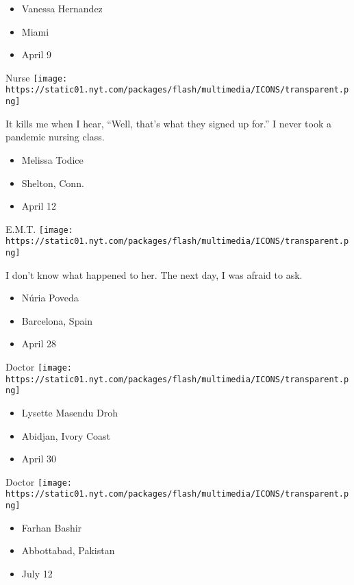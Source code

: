 \begin{itemize}
\tightlist
\item
  Vanessa Hernandez
\item
  Miami
\item
  April 9
\end{itemize}

\protect\hyperlink{item-melissa-todice}{}

Nurse
\texttt{[image: https://static01.nyt.com/packages/flash/multimedia/ICONS/transparent.png]}

It kills me when I hear, ``Well, that's what they signed up for.'' I
never took a pandemic nursing class.

\begin{itemize}
\tightlist
\item
  Melissa Todice
\item
  Shelton, Conn.
\item
  April 12
\end{itemize}

\protect\hyperlink{item-nuria-poveda}{}

E.M.T.
\texttt{[image: https://static01.nyt.com/packages/flash/multimedia/ICONS/transparent.png]}

I don't know what happened to her. The next day, I was afraid to ask.

\begin{itemize}
\tightlist
\item
  Núria Poveda
\item
  Barcelona, Spain
\item
  April 28
\end{itemize}

\protect\hyperlink{item-lysette-masendu-droh}{}

Doctor
\texttt{[image: https://static01.nyt.com/packages/flash/multimedia/ICONS/transparent.png]}

\begin{itemize}
\tightlist
\item
  Lysette Masendu Droh
\item
  Abidjan, Ivory Coast
\item
  April 30
\end{itemize}

\protect\hyperlink{item-farhan-bashir}{}

Doctor
\texttt{[image: https://static01.nyt.com/packages/flash/multimedia/ICONS/transparent.png]}

\begin{itemize}
\tightlist
\item
  Farhan Bashir
\item
  Abbottabad, Pakistan
\item
  July 12
\end{itemize}

